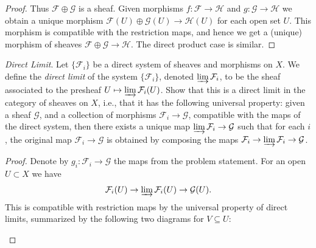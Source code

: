 \begin{problemset}
\begin{proof}
Thus $\mathcal F\oplus \mathcal G$ is a sheaf. Given morphisms $f:\mathcal F\to \mathcal H$ and $g:\mathcal G\to \mathcal H$ we obtain a unique morphism $\mathcal F(U)\oplus \mathcal G(U) \to \mathcal H(U)$ for each open set $U$. This morphism is compatible with the restriction maps, and hence we get a (unique) morphism of sheaves $\mathcal F\oplus\mathcal G\to \mathcal H$. The direct product case is similar. 
\end{proof}
\item \label{prob:2_1_10} \emph{Direct Limit}. Let $\{\mathcal F_i\}$ be a direct system of sheaves and morphisms on $X$. We define the \emph{direct limit} of the system $\{\mathcal F_i\}$, denoted $\varinjlim \mathcal F_i$, to be the sheaf associated to the presheaf $U\mapsto \varinjlim \mathcal F_i(U)$. Show that this is a direct limit in the category of sheaves on $X$, i.e., that it has the following universal property: given a sheaf $\mathcal G$, and a collection of morphisms $\mathcal F_i \to \mathcal G$, compatible with the maps of the direct system, then there exists a unique map $\varinjlim \mathcal F_i \to \mathcal G$ such that for each $i$, the original map $\mathcal F_i \to \mathcal G$ is obtained by composing the maps $\mathcal F_i\to \varinjlim \mathcal F_i \to \mathcal G$.
	\begin{proof}
		Denote by $g_i:\mathcal F_i \to \mathcal G$ the maps from the problem statement. For an open $U\subset X$ we have
		\begin{align*}
			\mathcal F_i(U) \to \varinjlim \mathcal F_i(U) \to \mathcal G(U).
		\end{align*}
		This is compatible with restriction maps by the universal property of direct limits, summarized by the following two diagrams for $V\subseteq U$:
		\begin{center}
\end{center}
\end{proof}
\end{problemset}
